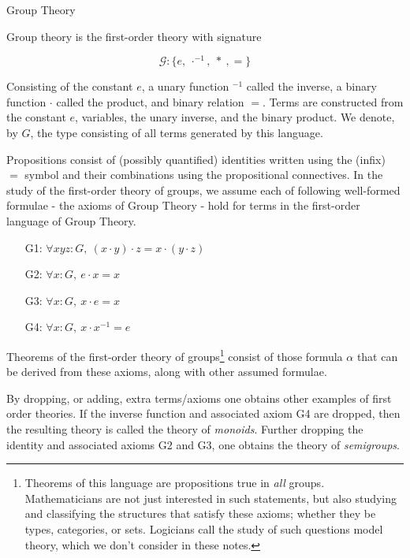 \documentclass{book}
\begin{document}
    \begin{eg}{Group Theory}

        Group theory is the first-order theory with signature

        $$ \mathcal{G} : \{e, \ \cdot^{-1}, \ * \ , =\} $$

        Consisting of the constant $e$, a unary function $^{-1}$ called the inverse, a binary function $\cdot$ called the product, and binary relation $=$. Terms are constructed from the constant $e$, variables, the unary inverse, and the binary product. We denote, by $G$, the type consisting of all terms generated by this language.        
        
        Propositions consist of (possibly quantified) identities written using the (infix) $=$ symbol and their combinations using the propositional connectives.  In the study of the first-order theory of groups, we assume each of following well-formed formulae - the axioms of Group Theory - hold for terms in the first-order language of Group Theory.
        \begin{center}
            \begin{itemize}
                \item[G1:] $\forall x y z : G, \ (x \cdot y) \cdot z = x \cdot (y \cdot z)$
                \item[G2:] $\forall x : G, \ e \cdot x = x$
                \item[G3:] $\forall x : G, \ x \cdot e = x$    
                \item[G4:] $\forall x : G, \ x \cdot x^{-1} = e$                        
            \end{itemize}
        \end{center}

        Theorems of the first-order theory of groups\footnote{Theorems of this language are propositions true in \emph{all} groups. Mathematicians are not just interested in such statements, but also studying and classifying the structures that satisfy these axioms; whether they be types, categories, or sets. Logicians call the study of such questions model theory, which we don't consider in these notes.} consist of those formula $\alpha$ that can be derived from these axioms, along with other assumed formulae.
    \end{eg}

    By dropping, or adding, extra terms/axioms one obtains other examples of first order theories. If the inverse function and associated axiom G4 are dropped, then the resulting theory is called the theory of \emph{monoids}. Further dropping the identity and associated axioms G2 and G3, one obtains the theory of \emph{semigroups}.
\end{document}
